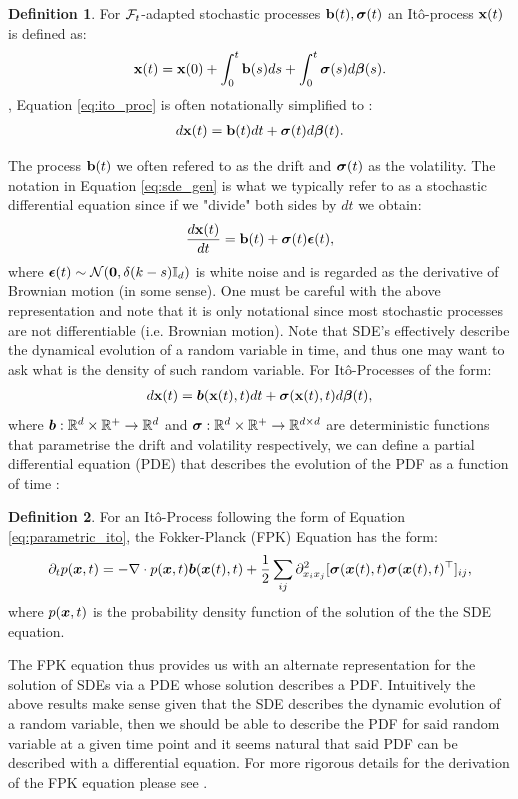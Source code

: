 \documentclass[a4paper,12pt,twoside,openright]{report}
\theoremstyle{definition}
\newtheorem{definition}{Definition}[section]
\begin{document}
\begin{definition}
    For ${\mathcal{F}}_t$-adapted stochastic processes ${\mathbf{b}}(t), {\bm{\sigma}}(t)$ an Itô-process ${\mathbf{x}}(t)$ is defined as:
    \begin{align}\label{eq:ito_proc}
    {\mathbf{x}}(t) = {\mathbf{x}}(0) + \int_{0}^t {\mathbf{b}}(s) ds + \int_0^t {\bm{\sigma}}(s) d{\bm{\beta}}(s).
    \end{align},
Equation \ref{eq:ito_proc} is often notationally simplified to :
    \begin{align}\label{eq:sde_gen}
        d{\mathbf{x}}(t) ={\mathbf{b}}(t) dt + {\bm{\sigma}}(t) d{\bm{\beta}}(t).
    \end{align}
\end{definition}
The process ${\mathbf{b}}(t)$ we often refered to as the drift and ${\bm{\sigma}}(t)$ as the volatility. The notation in Equation \ref{eq:sde_gen} is what we typically refer to as a stochastic differential equation since if we "divide" both sides by $dt$ we obtain:
\begin{align*}
    \frac{d {\mathbf{x}}(t)}{dt} = {\mathbf{b}}(t) + {\bm{\sigma}}(t) {\bm{\epsilon}}(t),
\end{align*}
where ${\bm{\epsilon}}(t) \sim {\mathcal{N}}({\bm{0}}, \delta(k-s){\mathbb{I}_d})$ is white noise and is regarded as the derivative of Brownian motion (in some sense). One must be careful with the above representation and note that it is only notational since most stochastic processes are not differentiable (i.e. Brownian motion).
Note that SDE's effectively describe the dynamical evolution of a random variable in time, and thus one may want to ask what is the density of such random variable. For Itô-Processes of the form:
\begin{align}\label{eq:parametric_ito}
     d{\mathbf{x}}(t) ={\bm{b}}({\mathbf{x}}(t), t) dt + {\bm{\sigma}}({\mathbf{x}}(t), t) d{\bm{\beta}}(t),
\end{align}
where ${\bm{b}} : {\mathbb{R}}^d \times {\mathbb{R}}^{+} \rightarrow {\mathbb{R}}^d$ and ${\bm{\sigma}} : {\mathbb{R}}^d \times {\mathbb{R}}^{+} \rightarrow {\mathbb{R}}^{d\times d}$ are deterministic functions that parametrise the drift and volatility respectively, we can define a partial differential equation (PDE) that describes the evolution of the PDF as a function of time \citep{sarkka2019applied}:
\begin{definition}\label{def:fpk}
    For an Itô-Process following the form of Equation \ref{eq:parametric_ito}, the Fokker-Planck (FPK) Equation has the form:
    \begin{align}\label{eq:fpk}
        \partial_{t} p({\bm{x}}, t) =-\nabla \cdot p({\bm{x}}, t){\bm{b}}({\bm{x}}(t), t) + \frac{1}{2} \sum_{ij} \partial^2_{{x_i}{x_j}}[{\bm{\sigma}}({\bm{x}}(t), t){\bm{\sigma}}({\bm{x}}(t), t)^{\top}]_{ij},
    \end{align}
    where $p({\bm{x}}, t)$ is the probability density function of the solution of the the SDE equation.
\end{definition}
The FPK equation thus provides us with an alternate representation for the solution of SDEs via a PDE whose solution describes a PDF. Intuitively the above results make sense given that the SDE describes the dynamic evolution of a random variable, then we should be able to describe the PDF for said random variable at a given time point and it seems natural that said PDF can be described with a differential equation. For more rigorous details for the derivation of the FPK equation please see \cite{sarkka2019applied}.
\end{document}
